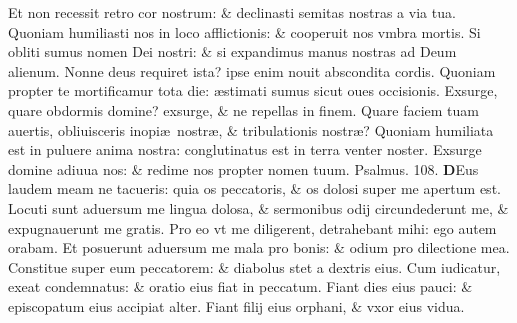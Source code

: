 \documentclass[a5paper,10pt]{book}
\def\ae{æ}
\begin{document}
\begin{multicols*}{2}
\newline \color{red} E\color{black}t non recessit retro cor nostrum: \& declinasti semitas nostras a via tua.
\newline \color{red} Q\color{black}uoniam humiliasti nos in loco afflictionis: \& cooperuit nos vmbra mortis.
\newline \color{red} S\color{black}i obliti sumus nomen Dei nostri: \& si expandimus manus nostras ad Deum alienum.
\newline \color{red} N\color{black}onne deus requiret ista? ipse enim nouit abscondita cordis.
\newline \color{red} Q\color{black}uoniam propter te mortificamur tota die: \ae stimati sumus sicut oues occisionis.
\newline \color{red} E\color{black}xsurge, quare obdormis domine? exsurge, \& ne repellas in finem.
\newline \color{red} Q\color{black}uare faciem tuam auertis, obliuisceris inopi\ae \ nostr\ae , \& tribulationis nostr\ae ?
\newline \color{red} Q\color{black}uoniam humiliata est in puluere anima nostra: conglutinatus est in terra venter noster.
\newline \color{red} E\color{black}xsurge domine adiuua nos: \& redime nos propter nomen tuum.
\newline \color{red} Psalmus. 108. \color{black}
\vspace{-1em}
\lettrine[lines=2]{\bfseries \color{red} D}{}Eus laudem meam ne tacueris: quia os peccatoris, \& os dolosi super me apertum est.
\newline \color{red} L\color{black}ocuti sunt aduersum me lingua dolosa, \& sermonibus odij circundederunt me, \& expugnauerunt me gratis.
\newline \color{red} P\color{black}ro eo vt me diligerent, detrahebant mihi: ego autem orabam.
\newline \color{red} E\color{black}t posuerunt aduersum me mala pro bonis: \& odium pro dilectione mea.
\newline \color{red} C\color{black}onstitue super eum peccatorem: \& diabolus stet a dextris eius.
\newline \color{red} C\color{black}um iudicatur, exeat condemnatus: \& oratio eius fiat in peccatum.
\newline \color{red} F\color{black}iant dies eius pauci: \& episcopatum eius accipiat alter.
\newline \color{red} F\color{black}iant filij eius orphani, \& vxor eius vidua.

\end{multicols*}
\end{document}
